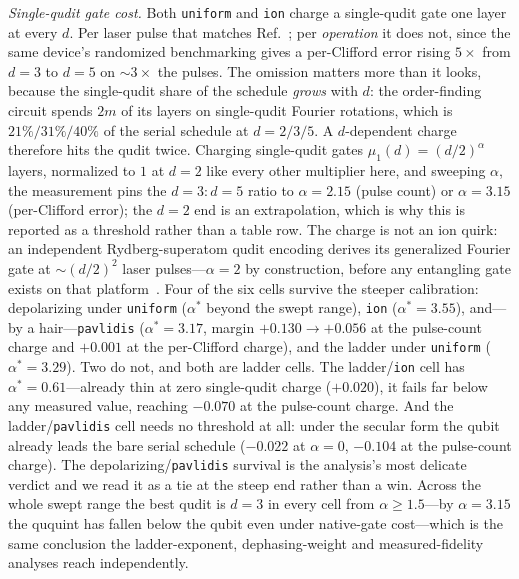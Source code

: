 \documentclass[aps,pra,reprint,superscriptaddress,nofootinbib,floatfix]{revtex4-2}
\begin{document}
\emph{Single-qudit gate cost.} Both \texttt{uniform} and \texttt{ion}
charge a single-qudit gate one layer at every $d$. Per laser pulse that
matches Ref.~\cite{ringbauer2022}; per \emph{operation} it does not,
since the same device's randomized benchmarking gives a per-Clifford
error rising $5\times$ from $d=3$ to $d=5$ on ${\sim}3\times$ the
pulses. The omission matters more than it looks, because the
single-qudit share of the schedule \emph{grows} with $d$: the
order-finding circuit spends $2m$ of its layers on single-qudit
Fourier rotations, which is $21\%/31\%/40\%$ of the serial schedule at
$d=2/3/5$. A $d$-dependent charge therefore hits the qudit twice.
Charging single-qudit gates $\mu_1(d)=(d/2)^\alpha$ layers, normalized
to $1$ at $d=2$ like every other multiplier here, and sweeping
$\alpha$, the measurement pins the $d{=}3:d{=}5$ ratio to
$\alpha=2.15$ (pulse count) or $\alpha=3.15$ (per-Clifford error);
the $d=2$ end is an extrapolation, which is why this is reported as a
threshold rather than a table row. The charge is not an ion quirk:
an independent Rydberg-superatom qudit encoding derives its
generalized Fourier gate at ${\sim}(d/2)^2$ laser pulses---$\alpha=2$
by construction, before any entangling gate exists on that
platform~\cite{robert2026}. Four of the six cells survive the
steeper calibration: depolarizing under \texttt{uniform}
($\alpha^\ast$ beyond the swept range), \texttt{ion}
($\alpha^\ast=3.55$), and---by a hair---\texttt{pavlidis}
($\alpha^\ast=3.17$, margin $+0.130\to+0.056$ at the pulse-count
charge and $+0.001$ at the per-Clifford charge), and the ladder under
\texttt{uniform}
($\alpha^\ast=3.29$). Two do not, and both are ladder cells. The
ladder/\texttt{ion} cell has $\alpha^\ast=0.61$---already thin at
zero single-qudit charge ($+0.020$), it fails far below any measured
value, reaching $-0.070$ at the pulse-count charge. And the
ladder/\texttt{pavlidis} cell needs no threshold at all: under the
secular form the qubit already leads the bare serial schedule
($-0.022$ at $\alpha=0$, $-0.104$ at the pulse-count charge). The
depolarizing/\texttt{pavlidis} survival is the analysis's most
delicate verdict and we read it as a tie at the steep end rather
than a win. Across the whole
swept range the best qudit is $d=3$ in every cell from
$\alpha\ge1.5$---by $\alpha=3.15$ the ququint has fallen below the
qubit even under native-gate cost---which is the same conclusion the
ladder-exponent, dephasing-weight and measured-fidelity analyses
reach independently.
\end{document}

